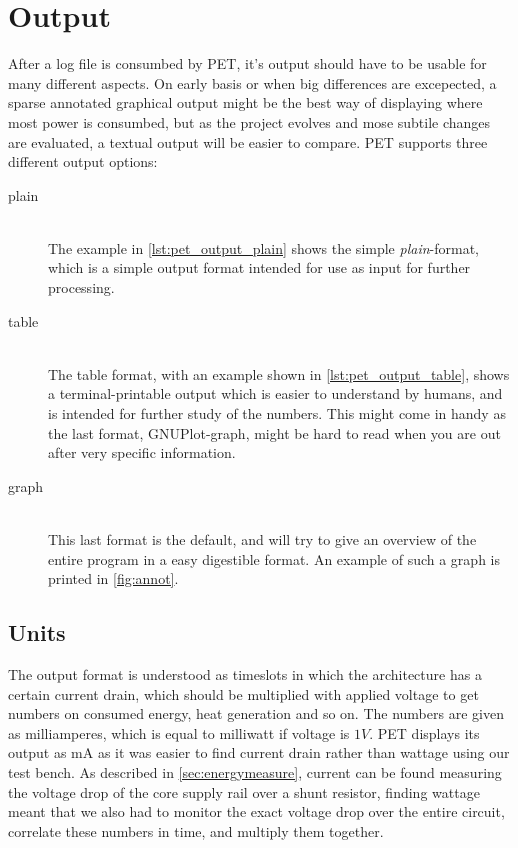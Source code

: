 \section{Output}

After a log file is consumbed by PET, it's output should have to be usable for
many different aspects. On early basis or when big differences are excepected, a
sparse annotated graphical output might be the best way of displaying where most
power is consumbed, but as the project evolves and mose subtile changes are
evaluated, a textual output will be easier to compare. PET supports three
different output options:

\begin{description}
    \item[plain]\hfill\\
        The example in \autoref{lst:pet_output_plain} shows the simple
        \emph{plain}-format, which is a simple output format intended for
        use as input for further processing.
    \item[table]\hfill\\
        The table format, with an example shown in \autoref{lst:pet_output_table},
        shows a terminal-printable output which is easier to understand by
        humans, and is intended for further study of the numbers. This might
        come in handy as the last format, GNUPlot-graph, might be hard to
        read when you are out after very specific information.
    \item[graph]\hfill\\
        This last format is the default, and will try to give an overview of
        the entire program in a easy digestible format. An example of such
        a graph is printed in \autoref{fig:annot}.
\end{description}

\subsection{Units}

The output format is understood as timeslots in which the architecture has a
certain current drain, which should be multiplied with applied voltage to get
numbers on consumed energy, heat generation and so on. The numbers are given as
milliamperes, which is equal to milliwatt if voltage is $1V$. PET displays its
output as mA as it was easier to find current drain rather than wattage using
our test bench. As described in \autoref{sec:energymeasure}, current can be
found measuring the voltage drop of the core supply rail over a shunt resistor,
finding wattage meant that we also had to monitor the exact voltage drop over
the entire circuit, correlate these numbers in time, and multiply them together.

